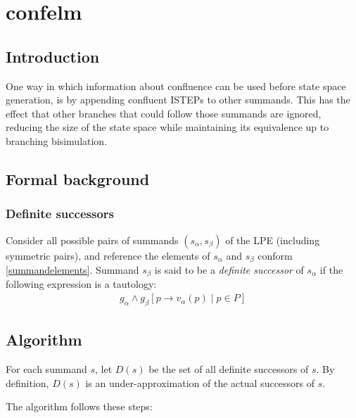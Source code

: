\chapter{confelm}

\section{Introduction}
One way in which information about confluence can be used before state space generation, is by appending confluent ISTEPs to other summands.
This has the effect that other branches that could follow those summands are ignored, reducing the size of the state space while maintaining its equivalence up to branching bisimulation.

\section{Formal background}

\subsection{Definite successors}

Consider all possible pairs of summands $(s_\alpha, s_\beta)$ of the LPE (including symmetric pairs), and reference the elements of $s_\alpha$ and $s_\beta$ conform \ref{summandelements}.
Summand $s_\beta$ is said to be a \emph{definite successor} of $s_\alpha$ if the following expression is a tautology:
\begin{align*}
g_\alpha \land {g_\beta}[p \rightarrow v_\alpha(p) \;|\; p \in P]
\end{align*}

\section{Algorithm}

For each summand $s$, let $D(s)$ be the set of all definite successors of $s$.
By definition, $D(s)$ is an under-approximation of the actual successors of $s$.

The algorithm follows these steps:


